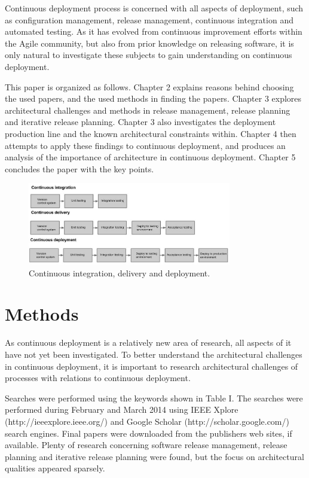 \documentclass[conference]{IEEEtran}
\begin{document}
Continuous deployment process is concerned with all aspects of deployment, such as configuration management, release management, continuous integration and automated testing. As it has evolved from continuous improvement efforts within the Agile community, but also from prior knowledge on releasing software, it is only natural to investigate these subjects to gain understanding on continuous deployment.

This paper is organized as follows. Chapter 2 explains reasons behind choosing the used papers, and the used methods in finding the papers. Chapter 3 explores architectural challenges and methods in release management, release planning and iterative release planning. Chapter 3 also investigates the deployment production line and the known architectural constraints within. Chapter 4 then attempts to apply these findings to continuous deployment, and produces an analysis of the importance of architecture in continuous deployment. Chapter 5 concludes the paper with the key points.  

\begin{figure}[!t]
	\centering
	\includegraphics[width=3.5in]{rtvd.jpg}
	\caption{Continuous integration, delivery and deployment.}
	\label{fig1}
\end{figure}

\section{Methods} %

As continuous deployment is a relatively new area of research, all aspects of it have not yet been investigated. To better understand the architectural challenges in continuous deployment, it is important to research architectural challenges of processes with relations to continuous deployment.

Searches were performed using the keywords shown in Table I. The searches were performed during February and March 2014 using IEEE Xplore (http://ieeexplore.ieee.org/‎) and Google Scholar (http://scholar.google.com/) search engines. Final papers were downloaded from the publishers web sites, if available. Plenty of research concerning software release management, release planning and iterative release planning were found, but the focus on architectural qualities appeared sparsely.  
\end{document}
